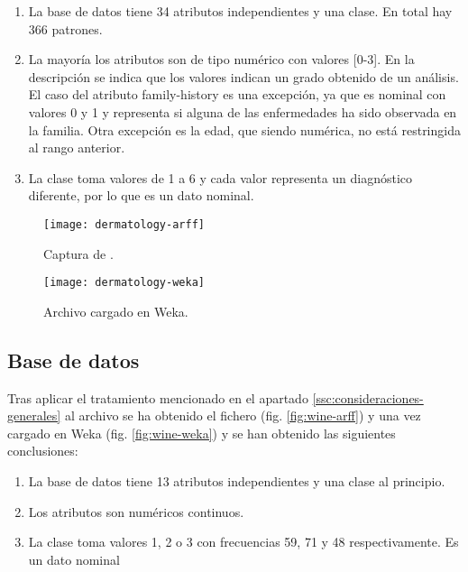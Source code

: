 \begin{enumerate}
    \item La base de datos tiene 34 atributos independientes y una clase. En total hay 366 patrones.
    \item La mayoría los atributos son de tipo numérico con valores [0-3]. En la descripción se indica que los valores indican un grado obtenido de un análisis. El caso del atributo family-history es una excepción, ya que es nominal con valores 0 y 1 y representa si alguna de las enfermedades ha sido observada en la familia. Otra excepción es la edad, que siendo numérica, no está restringida al rango anterior.
    \item La clase toma valores de 1 a 6 y cada valor representa un diagnóstico diferente, por lo que es un dato nominal.
\end{enumerate}
\begin{figure}[H]
    \centering
    \begin{minipage}{0.45\textwidth}
        \centering
        \texttt{[image: dermatology-arff]}
        \caption{Captura de .}
        \label{fig:dermatology-arff}
    \end{minipage}\hfill
    \begin{minipage}{0.55\textwidth}
        \centering
        \texttt{[image: dermatology-weka]}
        \caption{Archivo  cargado en Weka.}
        \label{fig:dermatology-weka}
    \end{minipage}
\end{figure}


\subsection{Base de datos }
Tras aplicar el tratamiento mencionado en el apartado \ref{ssc:consideraciones-generales} al archivo  se ha obtenido el fichero  (fig. \ref{fig:wine-arff}) y una vez cargado en Weka (fig. \ref{fig:wine-weka}) y se han obtenido las siguientes conclusiones:

\begin{enumerate}
\item La base de datos tiene 13 atributos independientes y una clase al principio.
\item Los atributos son numéricos continuos.
\item La clase toma valores 1, 2 o 3 con frecuencias 59, 71 y 48 respectivamente. Es un dato nominal
\end{enumerate}


